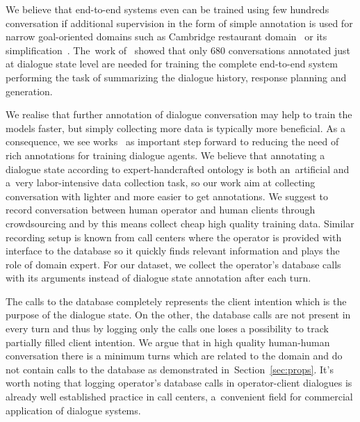 \documentclass[runningheads,a4paper]{llncs}
\begin{document}
We believe that end-to-end systems even can be trained using few hundreds conversation if additional supervision in the form of simple annotation is used for narrow goal-oriented domains such as Cambridge restaurant domain~\cite{henderson2014dstc2} or its simplification~\cite{wen2016network}.
The~work of~\cite{wen2016network} showed that only 680 conversations annotated just at dialogue state level are needed for training the complete end-to-end system performing the task of summarizing the dialogue history, response planning and generation.

We realise that further annotation of dialogue conversation may help to train the models faster, but simply collecting more data is typically more beneficial.
As a consequence, we see works~\cite{wen2016network,bordes2016learning,williams2016end} as important step forward to reducing the need of rich annotations for training dialogue agents.
We believe that annotating a dialogue state according to expert-handcrafted ontology is both an~artificial and a~very labor-intensive data collection task, so our work aim at collecting conversation with lighter and more easier to get annotations.
We suggest to record conversation between human operator and human clients through crowdsourcing and by this means collect cheap high quality training data.
Similar recording setup is known from call centers where the operator is provided with interface to the database so it quickly finds relevant information and plays the role of domain expert.
For our dataset, we collect the operator's database calls with its arguments instead of dialogue state annotation after each turn.

The calls to the database completely represents the client intention which is the purpose of the dialogue state.
On the other, the database calls are not present in every turn and thus by logging only the calls one loses a possibility to track partially filled client intention.
We argue that in high quality human-human conversation there is a minimum turns which are related to the domain and do not contain calls to the database as demonstrated in~Section~\ref{sec:props}.
It's worth noting that logging operator's database calls in operator-client dialogues is already well established practice in call centers, a~convenient field for commercial application of dialogue systems.
\end{document}

